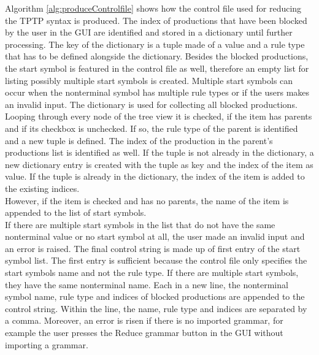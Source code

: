 Algorithm \ref{alg:produceControlfile} shows how the control file used for reducing the \ac{TPTP} syntax is produced.
The index of productions that have been blocked by the user in the GUI are identified and stored in a dictionary until further processing.
The key of the dictionary is a tuple made of a value and a rule type that has to be defined alongside the dictionary.
Besides the blocked productions, the start symbol is featured in the control file as well, therefore an empty list for listing possibly multiple start symbols is created.
Multiple start symbols can occur when the nonterminal symbol has multiple rule types or if the users makes an invalid input. The dictionary is used for collecting all blocked productions. Looping through every node of the tree view it is checked, if the item has parents and if its checkbox is unchecked. If so, the rule type of the parent is identified and a new tuple is defined. The index of the production in the parent's productions list is identified as well. If the tuple is not already in the dictionary, a new dictionary entry is created with the tuple as key and the index of the item as value. If the tuple is already in the dictionary, the index of the item is added to the existing indices. \\
However, if the item is checked and has no parents, the name of the item is appended to the list of start symbols. \\
If there are multiple start symbols in the list that do not have the same nonterminal value or no start symbol at all, the user made an invalid input and an error is raised. 
The final control string is made up of first entry of the start symbol list. The first entry is sufficient because the control file only specifies the start symbols name and not the rule type.
If there are multiple start symbols, they have the same nonterminal name. 
Each in a new line, the nonterminal symbol name, rule type and indices of blocked productions are appended to the control string. Within the line, the name, rule type and indices are separated by a comma.
Moreover, an error is risen if there is no imported grammar, for example the user presses the Reduce grammar button in the GUI without importing a grammar.

